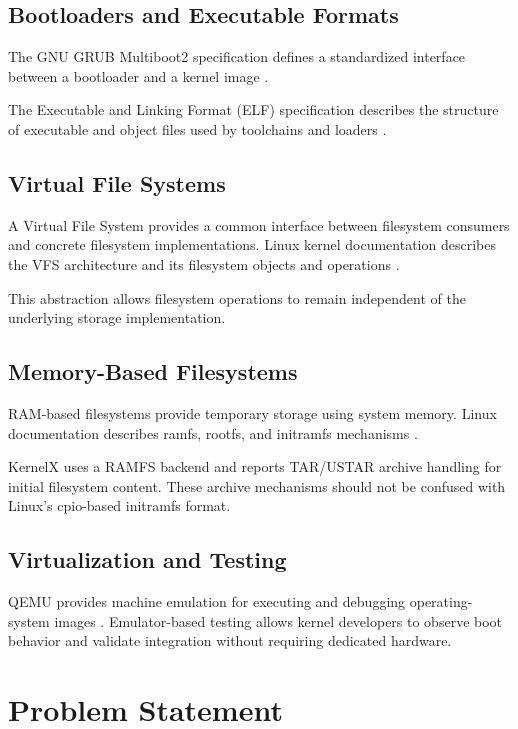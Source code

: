 \documentclass[conference]{IEEEtran}
\begin{document}
\subsection{Bootloaders and Executable Formats}

The GNU GRUB Multiboot2 specification defines a standardized
interface between a bootloader and a kernel image \cite{multiboot}.

The Executable and Linking Format (ELF) specification describes
the structure of executable and object files used by toolchains
and loaders \cite{elf}.

\subsection{Virtual File Systems}

A Virtual File System provides a common interface between
filesystem consumers and concrete filesystem implementations.
Linux kernel documentation describes the VFS architecture
and its filesystem objects and operations \cite{vfs}.

This abstraction allows filesystem operations to remain
independent of the underlying storage implementation.

\subsection{Memory-Based Filesystems}

RAM-based filesystems provide temporary storage using system
memory. Linux documentation describes ramfs, rootfs, and
initramfs mechanisms \cite{initramfs}.

KernelX uses a RAMFS backend and reports TAR/USTAR archive
handling for initial filesystem content. These archive
mechanisms should not be confused with Linux's cpio-based
initramfs format.

\subsection{Virtualization and Testing}

QEMU provides machine emulation for executing and debugging
operating-system images \cite{qemu}. Emulator-based testing
allows kernel developers to observe boot behavior and
validate integration without requiring dedicated hardware.

\section{Problem Statement}
\end{document}
